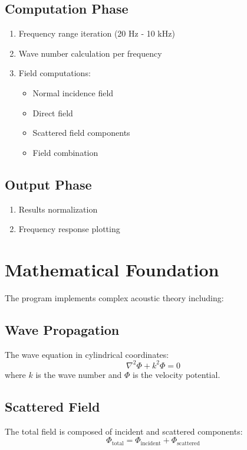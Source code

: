 \documentclass[12pt,a4paper]{article}
\begin{document}
\subsection{Computation Phase}
\begin{enumerate}
    \item Frequency range iteration (20 Hz - 10 kHz)
    \item Wave number calculation per frequency
    \item Field computations:
    \begin{itemize}
        \item Normal incidence field
        \item Direct field
        \item Scattered field components
        \item Field combination
    \end{itemize}
\end{enumerate}

\subsection{Output Phase}
\begin{enumerate}
    \item Results normalization
    \item Frequency response plotting
\end{enumerate}

\section{Mathematical Foundation}
The program implements complex acoustic theory including:

\subsection{Wave Propagation}
The wave equation in cylindrical coordinates:
\begin{equation}
    \nabla^2\Phi + k^2\Phi = 0
\end{equation}
where $k$ is the wave number and $\Phi$ is the velocity potential.

\subsection{Scattered Field}
The total field is composed of incident and scattered components:
\begin{equation}
    \Phi_{\text{total}} = \Phi_{\text{incident}} + \Phi_{\text{scattered}}
\end{equation}
\end{document}
